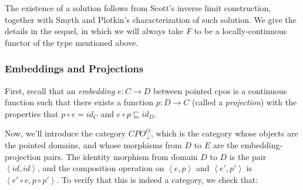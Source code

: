 The existence of a solution follows from Scott's inverse limit
construction, together with Smyth and Plotkin's characterization of
such solution. We give the details in the sequel, in which we will
always take $F$ to be a locally-continuous functor of the type
mentioned above.

\subsubsection{Embeddings and Projections}

First, recall that an \emph{embedding} $e : C \to D$ between pointed
cpos is a continuous function such that there exists a function $p : D
\to C$ (called a \emph{projection}) with the properties that $p \circ
e = id_C$ and $e \circ p \sqsubseteq id_D$. 

Now, we'll introduce the category $CPO_\bot^{O}$, which is the
category whose objects are the pointed domains, and whose morphisms
from $D$ to $E$ are the embedding-projection pairs. The identity
morphism from domain $D$ to $D$ is the pair $\left<id, id\right>$, and
the composition operation on $\left<e, p\right>$ and $\left<e',
p'\right>$ is $\left<e' \circ e, p \circ p'\right>$. To verify that
this is indeed a category, we check that:


